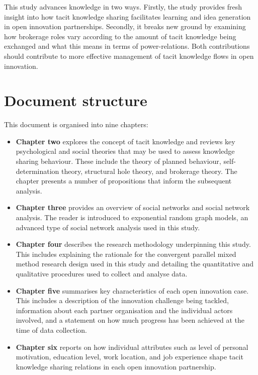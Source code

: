 This study advances knowledge in two ways. Firstly, the study provides fresh insight into how tacit knowledge sharing facilitates learning and idea generation in open innovation partnerships. Secondly, it breaks new ground by examining how brokerage roles vary according to the amount of tacit knowledge being exchanged and what this means in terms of power-relations. Both contributions should contribute to more effective management of tacit knowledge flows in open innovation. \medskip

\section{Document structure}

This document is organised into nine chapters:

\begin{itemize}[leftmargin=0pt]
  \item[] \textbf{Chapter two} explores the concept of tacit knowledge and reviews key psychological and social theories that may be used to assess knowledge sharing behaviour. These include the theory of planned behaviour, self-determination theory, structural hole theory, and brokerage theory. The chapter presents a number of propositions that inform the subsequent analysis.
  
  \item[] \textbf{Chapter three} provides an overview of social networks and social network analysis. The reader is introduced to exponential random graph models, an advanced type of social network analysis used in this study.
  
  \item[] \textbf{Chapter four} describes the research methodology underpinning this study. This includes explaining the rationale for the convergent parallel mixed method research design used in this study and detailing the quantitative and qualitative procedures used to collect and analyse data.
  
  \item[] \textbf{Chapter five} summarises key characteristics of each open innovation case. This includes a description of the innovation challenge being tackled, information about each partner organisation and the individual actors involved, and a statement on how much progress has been achieved at the time of data collection.
  
  \item[] \textbf{Chapter six} reports on how individual attributes such as level of personal motivation, education level, work location, and job experience shape tacit knowledge sharing relations in each open innovation partnership.
  

\end{itemize}
